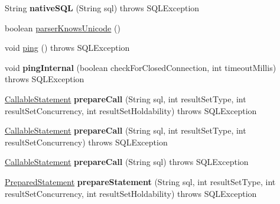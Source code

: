 \begin{DoxyCompactItemize}
String {\bfseries native\+S\+QL} (String sql)  throws S\+Q\+L\+Exception 
\item 
boolean \mbox{\hyperlink{classcom_1_1mysql_1_1jdbc_1_1_multi_host_my_s_q_l_connection_a3a325a2e459d6fcda172893f843c390d}{parser\+Knows\+Unicode}} ()
\item 
void \mbox{\hyperlink{classcom_1_1mysql_1_1jdbc_1_1_multi_host_my_s_q_l_connection_a636155352e7bad08773dd608f858676c}{ping}} ()  throws S\+Q\+L\+Exception 
\item 
\mbox{\label{classcom_1_1mysql_1_1jdbc_1_1_multi_host_my_s_q_l_connection_ae658930d7034d46d69b2cab7a3dda5f3}} 
void {\bfseries ping\+Internal} (boolean check\+For\+Closed\+Connection, int timeout\+Millis)  throws S\+Q\+L\+Exception 
\item 
\mbox{\label{classcom_1_1mysql_1_1jdbc_1_1_multi_host_my_s_q_l_connection_ac047ac3f71cf14a19f3f9952aa81508c}} 
\mbox{\hyperlink{classcom_1_1mysql_1_1jdbc_1_1_callable_statement}{Callable\+Statement}} {\bfseries prepare\+Call} (String sql, int result\+Set\+Type, int result\+Set\+Concurrency, int result\+Set\+Holdability)  throws S\+Q\+L\+Exception 
\item 
\mbox{\label{classcom_1_1mysql_1_1jdbc_1_1_multi_host_my_s_q_l_connection_aacb21418d07eb387c98eaeea26a60510}} 
\mbox{\hyperlink{classcom_1_1mysql_1_1jdbc_1_1_callable_statement}{Callable\+Statement}} {\bfseries prepare\+Call} (String sql, int result\+Set\+Type, int result\+Set\+Concurrency)  throws S\+Q\+L\+Exception 
\item 
\mbox{\label{classcom_1_1mysql_1_1jdbc_1_1_multi_host_my_s_q_l_connection_ad28860a953f626ad172a1f7f92e2e5c2}} 
\mbox{\hyperlink{classcom_1_1mysql_1_1jdbc_1_1_callable_statement}{Callable\+Statement}} {\bfseries prepare\+Call} (String sql)  throws S\+Q\+L\+Exception 
\item 
\mbox{\label{classcom_1_1mysql_1_1jdbc_1_1_multi_host_my_s_q_l_connection_a05d0c3c22bafabcbb26cc213cf24a7a9}} 
\mbox{\hyperlink{classcom_1_1mysql_1_1jdbc_1_1_prepared_statement}{Prepared\+Statement}} {\bfseries prepare\+Statement} (String sql, int result\+Set\+Type, int result\+Set\+Concurrency, int result\+Set\+Holdability)  throws S\+Q\+L\+Exception 

\end{DoxyCompactItemize}
